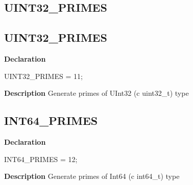 \documentclass{report}
\newif\ifpdf
\begin{document}
\subsection*{\large{\textbf{UINT32{\_}PRIMES}}\normalsize\hspace{1ex}\hrulefill}
\else
\subsection*{UINT32{\_}PRIMES}
\fi
\label{primesieve-UINT32_PRIMES}
\begin{list}{}{
\setlength{\itemindent}{0cm}
\setlength{\listparindent}{0cm}
\setlength{\leftmargin}{\evensidemargin}
\addtolength{\leftmargin}{\tmplength}
\settowidth{\labelsep}{X}
\addtolength{\leftmargin}{\labelsep}
\setlength{\labelwidth}{\tmplength}
}
\item[\textbf{Declaration}\hfill]
\ifpdf
\begin{flushleft}
\fi
\begin{ttfamily}
UINT32{\_}PRIMES = 11;\end{ttfamily}

\ifpdf
\end{flushleft}
\fi

\par
\item[\textbf{Description}]
Generate primes of UInt32 (c uint32{\_}t) type

\end{list}
\ifpdf
\subsection*{\large{\textbf{INT64{\_}PRIMES}}\normalsize\hspace{1ex}\hrulefill}
\else
\subsection*{INT64{\_}PRIMES}
\fi
\label{primesieve-INT64_PRIMES}
\begin{list}{}{
\setlength{\itemindent}{0cm}
\setlength{\listparindent}{0cm}
\setlength{\leftmargin}{\evensidemargin}
\addtolength{\leftmargin}{\tmplength}
\settowidth{\labelsep}{X}
\addtolength{\leftmargin}{\labelsep}
\setlength{\labelwidth}{\tmplength}
}
\item[\textbf{Declaration}\hfill]
\ifpdf
\begin{flushleft}
\fi
\begin{ttfamily}
INT64{\_}PRIMES = 12;\end{ttfamily}

\ifpdf
\end{flushleft}
\fi

\par
\item[\textbf{Description}]
Generate primes of Int64 (c int64{\_}t) type

\end{list}
\ifpdf
\end{document}
